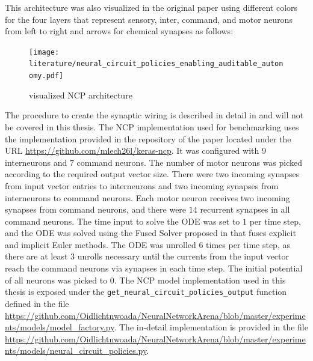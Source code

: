 \documentclass[draft,final]{vutinfth} %
\begin{document}
    This architecture was also visualized in the original paper using different colors for the four layers that represent sensory, inter, command, and motor neurons from left to right and arrows for chemical synapses as follows:
    \begin{figure}[H]
        \centering{}
        \texttt{[image: literature/neural\_circuit\_policies\_enabling\_auditable\_autonomy.pdf]}
        \caption{visualized NCP architecture \cite[p. 3]{NCP}}
        \label{fig:ncp_vis}
    \end{figure}
    The procedure to create the synaptic wiring is described in detail in \cite[p. 3]{NCP} and will not be covered in this thesis.
    The NCP implementation used for benchmarking uses the implementation provided in the repository of the paper \cite{NCP} located under the URL \url{https://github.com/mlech26l/keras-ncp}.
    It was configured with $9$ interneurons and $7$ command neurons. The number of motor neurons was picked according to the required output vector size.
    There were two incoming synapses from input vector entries to interneurons and two incoming synapses from interneurons to command neurons.
    Each motor neuron receives two incoming synapses from command neurons, and there were $14$ recurrent synapses in all command neurons.
    The time input to solve the ODE was set to $1$ per time step, and the ODE was solved using the Fused Solver proposed in \cite{LTCNetworks} that fuses explicit and implicit Euler methods.
    The ODE was unrolled $6$ times per time step, as there are at least $3$ unrolls necessary until the currents from the input vector reach the command neurons via synapses in each time step.
    The initial potential of all neurons was picked to $0$.
    The NCP model implementation used in this thesis is exposed under the \texttt{get\_neural\_circuit\_policies\_output} function defined in the file \url{https://github.com/Oidlichtnwoada/NeuralNetworkArena/blob/master/experiments/models/model_factory.py}.
    The in-detail implementation is provided in the file \url{https://github.com/Oidlichtnwoada/NeuralNetworkArena/blob/master/experiments/models/neural_circuit_policies.py}.
\end{document}
